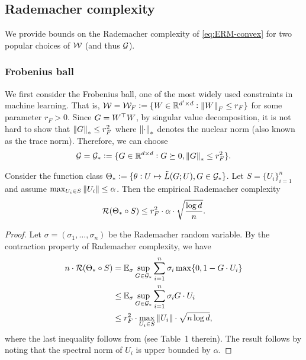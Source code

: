 \subsection{Rademacher complexity}\label{subsec:Rad}

We provide bounds on the Rademacher complexity of \eqref{eq:ERM-convex} for two popular choices of $\mathcal{W}$ (and thus $\mathcal{G}$).

\subsubsection{Frobenius ball}

We first consider the Frobenius ball, one of the most widely used constraints in machine learning. That is, $\mathcal{W} = \mathcal{W}_F := \{W \in \mathbb{R}^{d' \times d}: \left\lVert W \right\rVert_{F} \leq r_F\}$ for some parameter $r_F > 0$. Since $G = W^{\top} W$, by singular value decomposition, it is not hard to show that $\left\lVert G \right\rVert_{*} \leq r_F^2$ where $\left\lVert \cdot \right\rVert_{*}$ denotes the nuclear norm (also known as the trace norm). Therefore, we can choose 
\begin{equation}
\mathcal{G} = \mathcal{G}_* := \{G \in \mathbb{R}^{d \times d}: G \succeq 0, \left\lVert G \right\rVert_{*} \leq r_F^2\}.
\end{equation}


\begin{lemma}\label{lem:Rad-nuclear}
Consider the function class $\Theta_* := \{ \theta: U \mapsto \tilde{L}(G; U), G \in \mathcal{G}_* \}$. Let $S = \{U_i\}_{i=1}^n$ and assume $\max_{U_i \in S} \left\lVert U_i \right\rVert \leq \alpha$. Then the empirical Rademacher complexity 
\begin{equation*}
\mathcal{R}(\Theta_* \circ S) \leq r^2_F \cdot \alpha \cdot \sqrt{\frac{\log d}{n}}.
\end{equation*}
\end{lemma}
\begin{proof}
Let $\sigma = (\sigma_1, \dots, \sigma_n)$ be the Rademacher random variable. By the contraction property of Rademacher complexity, we have
\begin{align*}
n \cdot  \mathcal{R}(\Theta_* \circ S) &= \mathbb{E}_{\sigma} \sup_{G \in \mathcal{G}_*} \sum_{i=1}^{n} \sigma_i \max\{0, 1 - G \cdot U_i\}\\
&\leq \mathbb{E}_{\sigma} \sup_{G \in \mathcal{G}_*} \sum_{i=1}^{n} \sigma_i  G \cdot U_i\\
&\leq r^2_F \cdot \max_{U_i \in S} \left\lVert U_i \right\rVert \cdot \sqrt{ n \log d},
\end{align*}
where the last inequality follows from \citet{KST12matrix} (see Table~1 therein). The result follows by noting that the spectral norm of $U_i$ is upper bounded by $\alpha$.
\end{proof}

